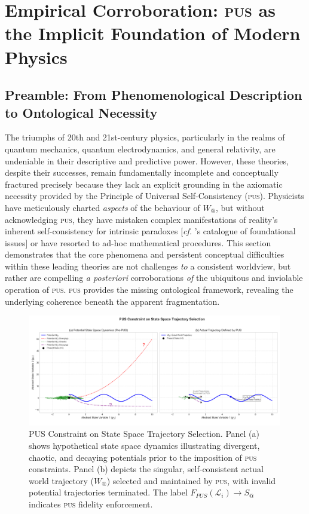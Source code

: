 \documentclass[11pt, a4paper]{article}
\makeatletter
\newcommand{\pus}{\textsc{pus}} %
\newcommand{\Wactual}{W_{@}} %
\makeatother
\begin{document}
\FloatBarrier

\section{Empirical Corroboration: \pus{} as the Implicit Foundation of Modern Physics}

\subsection{Preamble: From Phenomenological Description to Ontological Necessity}
The triumphs of 20th and 21st-century physics, particularly in the realms of quantum mechanics, quantum electrodynamics, and general relativity, are undeniable in their descriptive and predictive power. However, these theories, despite their successes, remain fundamentally incomplete and conceptually fractured precisely because they lack an explicit grounding in the axiomatic necessity provided by the Principle of Universal Self-Consistency (\pus). Physicists have meticulously charted \textit{aspects} of the behaviour of $\Wactual$, but without acknowledging \pus, they have mistaken complex manifestations of reality's inherent self-consistency for intrinsic paradoxes [\textit{cf.} \citealp{penrose2004}'s catalogue of foundational issues] or have resorted to ad-hoc mathematical procedures. This section demonstrates that the core phenomena and persistent conceptual difficulties within these leading theories are not challenges \textit{to} a consistent worldview, but rather are compelling \textit{a posteriori} corroborations \textit{of} the ubiquitous and inviolable operation of \pus. \pus{} provides the missing ontological framework, revealing the underlying coherence beneath the apparent fragmentation.

\begin{figure}[htbp]
    \centering
    \includegraphics[width=0.99\textwidth]{figures/pus_figure1_state_selection.png} %
    \caption{PUS Constraint on State Space Trajectory Selection. Panel (a) shows hypothetical state space dynamics illustrating divergent, chaotic, and decaying potentials prior to the imposition of \pus{} constraints. Panel (b) depicts the singular, self-consistent actual world trajectory ($\Wactual$) selected and maintained by \pus{}, with invalid potential trajectories terminated. The label $F_{PUS}(\mathcal{L}_i) \rightarrow S_{@}$ indicates \pus{} fidelity enforcement.}
    \label{fig:trajectory}
\end{figure}
\FloatBarrier 
\end{document}
